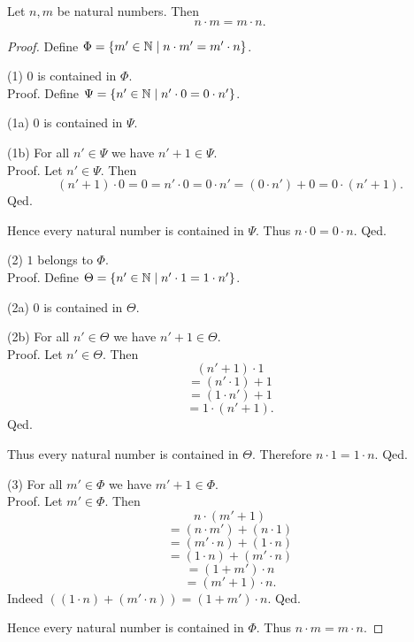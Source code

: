 \documentclass[10pt]{article}
\begin{document}
  \begin{forthel}
    \begin{proposition}
      Let $n, m$ be natural numbers.
      Then \[ n \cdot m = m \cdot n. \]
    \end{proposition}
    \begin{proof}
      Define $\Phi = \{ m' \in \mathbb{N} \mid n \cdot m' = m' \cdot n \}$.

      (1) $0$ is contained in $\Phi$. \\
      Proof.
        Define $\Psi = \{ n' \in \mathbb{N} \mid n' \cdot 0 = 0 \cdot n' \}$.

        (1a) $0$ is contained in $\Psi$.

        (1b) For all $n' \in \Psi$ we have $n' + 1 \in \Psi$. \\
        Proof.
          Let $n' \in \Psi$.
          Then
          \[ (n' + 1) \cdot 0
            = 0
            = n' \cdot 0
            = 0 \cdot n'
            = (0 \cdot n') + 0
            = 0 \cdot (n' + 1). \]
        Qed.

        Hence every natural number is contained in $\Psi$.
        Thus $n \cdot 0 = 0 \cdot n$.
      Qed.

      (2) $1$ belongs to $\Phi$. \\
      Proof.
        Define $\Theta = \{ n' \in \mathbb{N} \mid n' \cdot 1 = 1 \cdot n' \}$.

        (2a) $0$ is contained in $\Theta$.

        (2b) For all $n' \in \Theta$ we have $n' + 1 \in \Theta$. \\
        Proof.
          Let $n' \in \Theta$.
          Then
          \[  (n' + 1) \cdot 1        \]
          \[    = (n' \cdot 1) + 1    \]
          \[    = (1 \cdot n') + 1    \]
          \[    = 1 \cdot (n' + 1).   \]
        Qed.

        Thus every natural number is contained in $\Theta$.
        Therefore $n \cdot 1 = 1 \cdot n$.
      Qed.

      (3) For all $m' \in \Phi$ we have $m' + 1 \in \Phi$. \\
      Proof.
        Let $m' \in \Phi$.
        Then
        \[  n \cdot (m' + 1)                \]
        \[    = (n \cdot m') + (n \cdot 1)  \]
        \[    = (m' \cdot n) + (1 \cdot n)  \]
        \[    = (1 \cdot n) + (m' \cdot n)  \]
        \[    = (1 + m') \cdot n            \]
        \[    = (m' + 1) \cdot n.           \]
        Indeed $((1 \cdot n) + (m' \cdot n)) = (1 + m') \cdot n$. %
      Qed.

      Hence every natural number is contained in $\Phi$.
      Thus $n \cdot m = m \cdot n$.
    \end{proof}
  \end{forthel}
\end{document}
